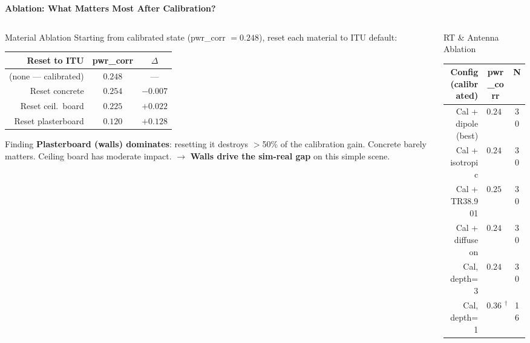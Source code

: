 \documentclass[
    aspectratio=169
]{beamer}
\begin{document}
\begin{frame}{\textbf{Ablation: What Matters Most After Calibration?}}
\vspace{-0.2cm}
\begin{columns}[T]
\begin{column}{0.48\textwidth}
\begin{block}{\footnotesize Material Ablation}
\footnotesize
Starting from calibrated state (pwr\_corr $= 0.248$), reset each material to ITU default:
\vspace{0.1cm}
\scriptsize
\begin{tabular}{rcc}
\toprule
\textbf{Reset to ITU} & \textbf{pwr\_corr} & \textbf{$\Delta$} \\
\midrule
\rowcolor{green!15} (none --- calibrated) & $0.248$ & --- \\
Reset concrete & $0.254$ & $-0.007$ \\
Reset ceil.\ board & $0.225$ & $+0.022$ \\
\rowcolor{red!15} Reset plasterboard & $0.120$ & $+0.128$ \\
\bottomrule
\end{tabular}
\footnotesize
\vspace{0.2cm}
\begin{block}{\scriptsize Finding}
\scriptsize
\textbf{Plasterboard (walls) dominates}: resetting it destroys $>$50\% of the calibration gain. Concrete barely matters. Ceiling board has moderate impact. $\to$ \textbf{Walls drive the sim-real gap} on this simple scene.
\end{block}
\end{block}
\end{column}
\begin{column}{0.48\textwidth}
\begin{block}{\footnotesize RT \& Antenna Ablation}
\scriptsize
\begin{tabular}{rcc}
\toprule
\textbf{Config (calibrated)} & \textbf{pwr\_corr} & \textbf{N} \\
\midrule
\rowcolor{green!15} Cal + dipole (best) & $\mathbf{0.248}$ & 30 \\
Cal + isotropic & $0.248$ & 30 \\
Cal + TR38.901 & $0.253$ & 30 \\
Cal + diffuse on & $0.248$ & 30 \\
Cal, depth=3 & $0.243$ & 30 \\
Cal, depth=1 & $0.366^\dagger$ & 16 \\
\bottomrule
\end{tabular}

\end{block}
\end{column}
\end{columns}
\end{frame}
\end{document}
